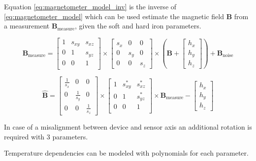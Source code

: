 Equation \ref{eq:magnetometer_model_inv} is the inverse of \ref{eq:magnetometer_model} which can be used estimate the magnetic field $\bm{B}$ from a measurement $\bm{B}_\text{measure}$, given the soft and hard iron parameters.

\begin{equation}
\label{eq:magnetometer_model}
    \bm{B}_\text{measure} = \left[\begin{matrix}
    1 & s_{xy} & s_{xz}\\
    0 & 1 & s_{yz}\\
    0 & 0 & 1\\
    \end{matrix}\right] \times \left[\begin{matrix}
    s_x & 0 & 0\\
    0 & s_y & 0\\
    0 & 0 & s_z\end{matrix}\right] \times \left(\bm{B} + \left[\begin{matrix}h_x\\h_y\\h_z\end{matrix}\right]\right) + \bm{B}_\text{noise}
\end{equation}

\begin{equation}
\label{eq:magnetometer_model_inv}
    \hat{\bm{B}} = \left[\begin{matrix}
    \frac{1}{s_x} & 0 & 0\\
    0 & \frac{1}{s_y} & 0\\
    0 & 0 & \frac{1}{s_z}\end{matrix}\right] \times \left[\begin{matrix}
    1 & s_{xy}^* & s_{xz}^*\\
    0 & 1 & s_{yz}^*\\
    0 & 0 & 1\\
    \end{matrix}\right] \times \bm{B}_\text{measure} - \left[\begin{matrix}h_x\\h_y\\h_z\end{matrix}\right]
\end{equation}

In case of a misalignment between device and sensor axis an additional rotation is required with 3 parameters.

Temperature dependencies can be modeled with polynomials for each parameter.

